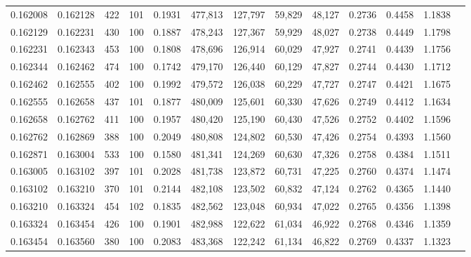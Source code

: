 \begin{tabular}{rrrrrrrrrrrrr}
0.162008 & 0.162128 &   422 & 101 &                                     0.1931 & 477,813 & 127,797 &  59,829 &  48,127 & 0.2736 & 0.4458 & 1.1838 \\
0.162129 & 0.162231 &   430 & 100 &                                     0.1887 & 478,243 & 127,367 &  59,929 &  48,027 & 0.2738 & 0.4449 & 1.1798 \\
0.162231 & 0.162343 &   453 & 100 &                                     0.1808 & 478,696 & 126,914 &  60,029 &  47,927 & 0.2741 & 0.4439 & 1.1756 \\
0.162344 & 0.162462 &   474 & 100 &                                     0.1742 & 479,170 & 126,440 &  60,129 &  47,827 & 0.2744 & 0.4430 & 1.1712 \\
0.162462 & 0.162555 &   402 & 100 &                                     0.1992 & 479,572 & 126,038 &  60,229 &  47,727 & 0.2747 & 0.4421 & 1.1675 \\
0.162555 & 0.162658 &   437 & 101 &                                     0.1877 & 480,009 & 125,601 &  60,330 &  47,626 & 0.2749 & 0.4412 & 1.1634 \\
0.162658 & 0.162762 &   411 & 100 &                                     0.1957 & 480,420 & 125,190 &  60,430 &  47,526 & 0.2752 & 0.4402 & 1.1596 \\
0.162762 & 0.162869 &   388 & 100 &                                     0.2049 & 480,808 & 124,802 &  60,530 &  47,426 & 0.2754 & 0.4393 & 1.1560 \\
0.162871 & 0.163004 &   533 & 100 &                                     0.1580 & 481,341 & 124,269 &  60,630 &  47,326 & 0.2758 & 0.4384 & 1.1511 \\
0.163005 & 0.163102 &   397 & 101 &                                     0.2028 & 481,738 & 123,872 &  60,731 &  47,225 & 0.2760 & 0.4374 & 1.1474 \\
0.163102 & 0.163210 &   370 & 101 &                                     0.2144 & 482,108 & 123,502 &  60,832 &  47,124 & 0.2762 & 0.4365 & 1.1440 \\
0.163210 & 0.163324 &   454 & 102 &                                     0.1835 & 482,562 & 123,048 &  60,934 &  47,022 & 0.2765 & 0.4356 & 1.1398 \\
0.163324 & 0.163454 &   426 & 100 &                                     0.1901 & 482,988 & 122,622 &  61,034 &  46,922 & 0.2768 & 0.4346 & 1.1359 \\
0.163454 & 0.163560 &   380 & 100 &                                     0.2083 & 483,368 & 122,242 &  61,134 &  46,822 & 0.2769 & 0.4337 & 1.1323 \\

\end{tabular}
